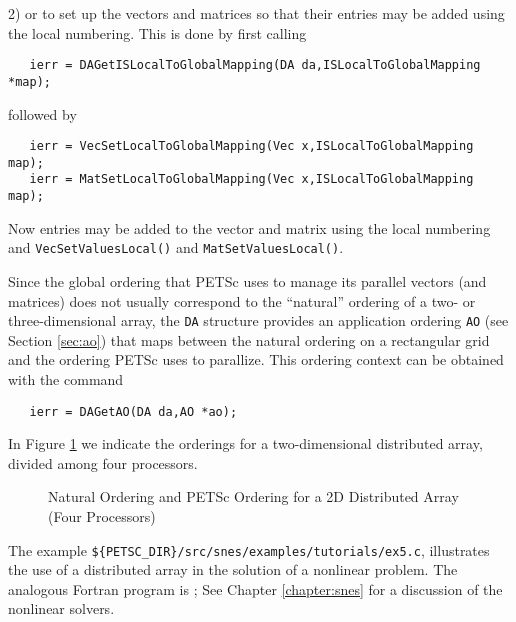 2) or to set up the vectors and matrices so that their entries may be
added using the local numbering. This is done by first calling 
\begin{verbatim}
   ierr = DAGetISLocalToGlobalMapping(DA da,ISLocalToGlobalMapping *map);
\end{verbatim}
followed by 
\begin{verbatim}
   ierr = VecSetLocalToGlobalMapping(Vec x,ISLocalToGlobalMapping map);
   ierr = MatSetLocalToGlobalMapping(Vec x,ISLocalToGlobalMapping map);
\end{verbatim}
Now entries may be added to the vector and matrix using the local numbering
and {\tt VecSetValuesLocal()} and {\tt MatSetValuesLocal()}.


Since the global ordering that PETSc uses to manage its parallel vectors 
(and matrices) does not usually correspond to the ``natural'' ordering 
of a two- or three-dimensional array, the {\tt DA} structure provides 
an application ordering {\tt AO} (see Section \ref{sec:ao}) that maps 
between the natural ordering on a rectangular grid and the ordering PETSc
uses to parallize. This ordering context can be obtained with the command
\begin{verbatim}
   ierr = DAGetAO(DA da,AO *ao);
\end{verbatim}
In Figure \ref{fig:daao} we indicate the orderings for a two-dimensional distributed 
array, divided among four processors.

\begin{figure}[tb]
\centerline{}
\caption{Natural Ordering and PETSc Ordering for a 2D Distributed Array (Four Processors)}
\label{fig:daao}
\end{figure}

The example
{\tt \$\{PETSC\_DIR\}/src/snes/examples/tutorials/ex5.c},
illustrates the use of a distributed array in the solution of
a nonlinear problem.  The analogous Fortran program is
;
See Chapter \ref{chapter:snes} for a discussion of the nonlinear
solvers.


